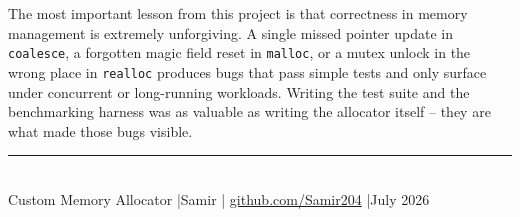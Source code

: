 \documentclass[12pt, a4paper]{report}
\begin{document}
The most important lesson from this project is that correctness in memory
management is extremely unforgiving. A single missed pointer update in
\texttt{coalesce}, a forgotten magic field reset in \texttt{malloc}, or a mutex
unlock in the wrong place in \texttt{realloc} produces bugs that pass simple
tests and only surface under concurrent or long-running workloads. Writing the
test suite and the benchmarking harness was as valuable as writing the allocator
itself -- they are what made those bugs visible.

\vspace{2em}
\begin{center}
\color{midgrey}
\rule{0.5\linewidth}{0.4pt}\\[6pt]
\small Custom Memory Allocator \quad|\quad Samir \quad|\quad
\href{https://github.com/Samir204}{github.com/Samir204} \quad|\quad July 2026
\end{center}
\end{document}

